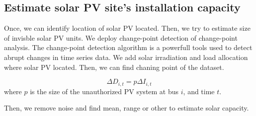 \subsection{Estimate solar PV site's installation capacity}

Once, we can identify location of solar PV located. Then, we try to estimate size of invisble solar PV units.
We deploy change-point detection of change-point analysis.
The change-point detection algorithm is a powerfull tools used to detect abrupt changes in time series data.
We add solar irradiation and load allocation where solar PV located. Then, we can find chaning point of the dataset.


\begin{equation}
  \Delta D_{i,t} = p\Delta I_{i,t}
\end{equation}
where $p$ is the size of the unauthorized PV system at bus $i$, and time $t$.

Then, we remove noise and find mean, range or other to estimate solar capacity.

